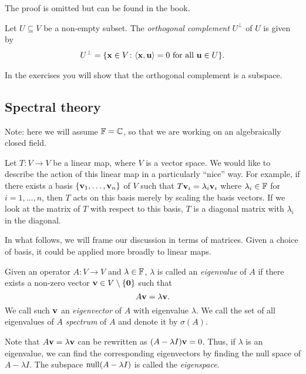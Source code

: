 \documentclass{article}
\begin{document}
The proof is omitted but can be found in the book.

\begin{definition}
Let $U\subseteq V$ be a non-empty subset. The \emph{orthogonal complement} $U^\perp$ of $U$ is given by
\begin{align*}
    U^\perp = \{ {\mathbf{x}} \in V \colon \langle {\mathbf{x}},{\mathbf{u}} \rangle = 0 \text{ for all } {\mathbf{u}} \in U\}.
\end{align*}
\end{definition}

In the exercises you will show that the orthogonal complement is a subspace. 


\subsection{Spectral theory}

Note: here we will assume ${\mathbb{F}} = {\mathbb{C}}$, so that we are working on an algebraically closed field.


Let $T \colon V \to V$ be a linear map, where $V$ is a vector space.  We would like to describe the action of this linear map in a particularly ``nice'' way. For example, if there exists a basis $\{{\mathbf{v}}_1, \ldots, {\mathbf{v}}_n\}$ of $V$ such that $T{\mathbf{v}}_i = \lambda_i {\mathbf{v}}_i$ where $\lambda_i \in {\mathbb{F}}$ for $i = 1, \ldots, n$, then $T$ acts on this basis merely by scaling the basis vectors. If we look at the matrix of $T$ with respect to this basis, $T$ is a diagonal matrix with $\lambda_i$ in the diagonal. 

In what follows, we will frame our discussion in terms of matrices. Given a choice of basis, it could be applied more broadly to linear maps.

\begin{definition}
Given an operator $A \colon V \to V$ and $\lambda \in {\mathbb{F}}$, $\lambda$ is called an \emph{eigenvalue} of $A$ if there exists a non-zero vector ${\mathbf{v}} \in V\setminus\{{\mathbf{0}}\}$ such that 
$$A {\mathbf{v}} = \lambda {\mathbf{v}}.$$
We call such ${\mathbf{v}}$ an \emph{eigenvector} of $A$ with eigenvalue $\lambda$. We call the set of all eigenvalues of $A$ \emph{spectrum} of $A$ and denote it by $\sigma(A)$.
\end{definition}

Note that $A {\mathbf{v}} = \lambda {\mathbf{v}}$ can be rewritten as $(A - \lambda I) {\mathbf{v}}= 0$. Thus, if $\lambda$ is an eigenvalue, we can find the corresponding eigenvectors by finding the null space of $A - \lambda I$. The subspace $\operatorname{null} (A - \lambda I)$ is called the \emph{eigenspace}.
\end{document}

